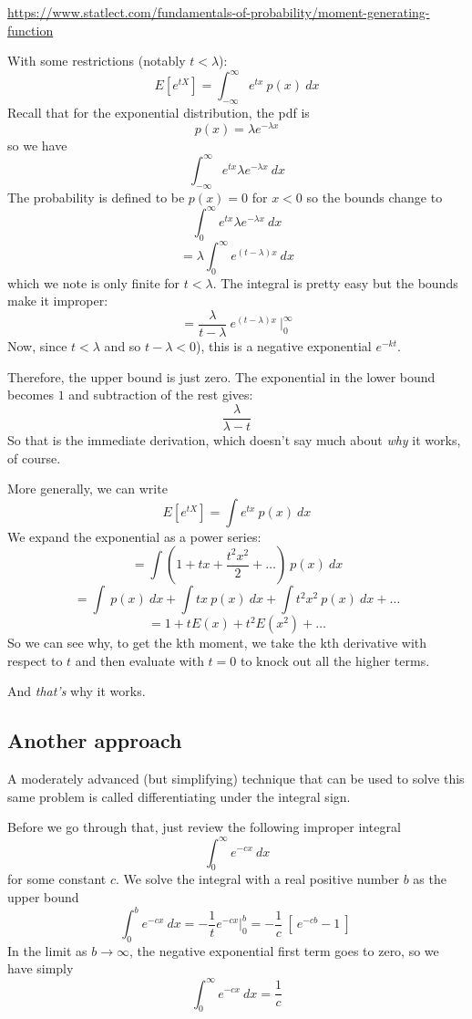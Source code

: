 \documentclass[11pt, oneside]{article}   	%
\begin{document}
\small
\url{https://www.statlect.com/fundamentals-of-probability/moment-generating-function}
\Large

With some restrictions (notably $t < \lambda$):
\[ E[ e^{tX} ]  =  \int_{-\infty}^{\infty}  e^{tx} \ p(x) \ dx \]
Recall that for the exponential distribution, the pdf is
\[ p(x) = \lambda e^{-\lambda x} \]
so we have
\[ \int_{-\infty}^{\infty}  e^{tx} \lambda e^{-\lambda x} \ dx \]
The probability is defined to be $p(x) = 0$ for $x < 0$ so the bounds change to
\[ \int_{0}^{\infty}  e^{tx} \lambda e^{-\lambda x} \ dx \]
\[ = \lambda \int_{0}^{\infty}  e^{(t - \lambda)x} \ dx \]
which we note is only finite for $t < \lambda$.  The integral is pretty easy but the bounds make it improper:
\[ = \frac{\lambda}{t - \lambda} \ e^{(t - \lambda)x} \ \bigg |_{0}^{\infty} \]
Now, since $t < \lambda$ and so $t- \lambda < 0$), this is a negative exponential $e^{-kt}$.

Therefore, the upper bound is just zero.  The exponential in the lower bound becomes $1$ and subtraction of the rest gives:
\[ \frac{\lambda}{\lambda - t}  \]
So that is the immediate derivation, which doesn't say much about \emph{why} it works, of course.

More generally, we can write
\[  E[ e^{tX} ]  = \int  e^{tx} \ p(x) \ dx \]
We expand the exponential as a power series:
\[ = \int  (1 + tx + \frac{t^2x^2}{2} + \dots) \ p(x) \ dx \]
\[ = \int \ p(x) \ dx + \int tx \ p(x) \ dx + \int t^2x^2 \ p(x) \ dx  + \dots \]
\[ = 1 + t E(x) + t^2 E(x^2) + \dots \]
So we can see why, to get the kth moment, we take the kth derivative with respect to $t$ and then evaluate with $t=0$ to knock out all the higher terms.

And \emph{that's} why it works.

\subsection*{Another approach}
A moderately advanced (but simplifying) technique that can be used to solve this same problem is called differentiating under the integral sign.  

Before we go through that, just review the following improper integral
\[ \int_0^{\infty} e^{-cx} \ dx \]
for some constant $c$.  We solve the integral with a real positive number $b$ as the upper bound
\[ \int_0^{b} e^{-cx} \ dx = -\frac{1}{t} e^{-cx} \bigg |_0^b = -\frac{1}{c} \ [ \ e^{-cb} - 1 \ ] \ \]
In the limit as $b \rightarrow \infty$, the negative exponential first term goes to zero, so we have simply
\[ \int_0^{\infty} e^{-cx} \ dx = \frac{1}{c} \]
\end{document}

